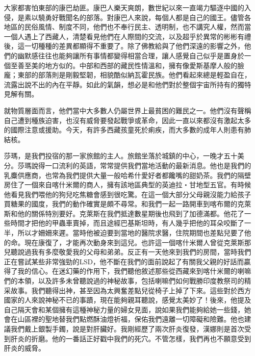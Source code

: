 大家都害怕東部的康巴劫匪。康巴人樂天爽朗，數世紀以來一直竭力驅逐中國的入侵，是素以驍勇好戰聞名的部落。對康巴人來說，每個人都是自己的國王。儘管各地區的民俗風情、制度不同，他們也不奉行民主、透明制，也不講究人權，然而當一個人遇上了西藏人，清楚看見他們在人際間的交流，以及超乎於異常的彬彬有禮後，這一切種種的差異都顯得不重要了。除了佛教給與了他們深遠的影響之外，他們的幽默感往往也能夠讓所有事情都變得相當合理，讓人感覺自己似乎是置身於一個至善至美的地方似的。中部和西部的藏民性情溫和，擁有像愛斯基摩人般的臉龐；東部的部落則是剛毅堅韌，相貌酷似納瓦霍民族。他們看起來總是輕盈自在，流露出說不出的內在平靜。如此的氣韻，想必是和他們對於整個宇宙所持有的獨特見解有關。

就物質層面而言，他們當中大多數人仍屬世界上最貧困的難民之一。他們沒有聲稱自己遭到種族迫害，也沒有威脅要發起戰爭或革命，因此一直以來都沒有激起太多的國際注意或援助。今天，有許多西藏孩童死於痢疾，而大多數的成年人則患有肺結核。

莎瑪，是我們投宿的那一家旅館的主人。旅館坐落於城鎮的中心，一晚才五十美分。莎瑪說得一口流利的英語，常常提供我們當地活動的最新消息。他也是我們的乳麋供應商，也常為我們提供大量一般哈希什愛好者都饞嘴的甜奶茶。我們的隔壁房住了一個來自喀什米爾的商人，擁有該地區典型的英迪拉‧甘地型五官。有時候他看見我們喂他的狗兒吃焦糖會感到很吃驚。在這一個大部分父母親沒能力給孩子買糖果的國度，我們的動作確實是頗不尋常。和我們一起一路開車到喀布爾的克萊斯和他的關係特別要好。克萊斯在我們抵達數星期後也飛到了加德滿都。他花了一些時間才把他的甲蟲車賣掉，而且途經巴基斯坦時，有人幾乎把他的耳朵咬斷了一半，所以才姍姍來遲。當時他被迫要到當地的醫院求醫，住院期間也差點兒要了他的命。現在康復了，才能再次動身來到這兒。也許這一個喀什米爾人曾從克萊斯那兒聽說過我有多麼敬愛我的父母和弟弟。反正有一天他來到我們的房間，當時我們正在嘗試某些非常強勁的LSD，他不斷在我們的面前說起了有關我父親的好話而贏得了我的信心。在迷幻藥的作用下，我們聽他敘述那些從西藏來到喀什米爾的喇嘛們的本領，以及許多未曾聽說過的神秘故事，包括喇嘛們如何戰勝印度教祭司的精采故事。我們聽得出神，甚至因為太興奮差點兒從椅子上掉了下來。這些對於西方國家的人來說神秘不已的事蹟，現在能夠親耳聽說，感覺太美妙了！後來，他提及自己隔天會和某個擁有這種神秘力量的婦女見面，說如果我們能夠給她一些錢，她會在山區裡的聖地替我們點燃酥油燈祈福，保佑我們遠離一切障礙和險難。他也建議我們戴上銀製手鐲，說是對肝臟好。我剛經歷了兩次肝炎復發，漢娜則是首次受到肝炎的折磨。他的一番話正好戳中我們的死穴。不管怎樣，我們再也不願意受到肝炎的威脅。

